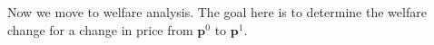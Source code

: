 Now we move to welfare analysis. The goal here is to determine the welfare change for a change in price from $\mathbf{p}^0$ to $\mathbf{p}^1$.